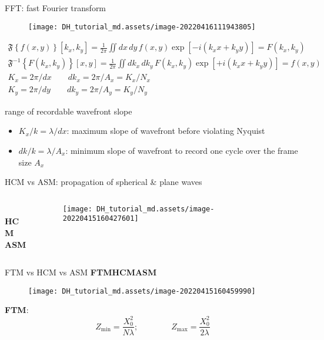 \documentclass[t, aspectratio=169]{beamer}
\begin{document}
\begin{frame}{FFT: fast Fourier transform}
	\begin{figure}
		\texttt{[image: DH\_tutorial\_md.assets/image-20220416111943805]}
	\end{figure}
	\begin{gather*}
\mathfrak F\left\{f(x,y)\right\}[k_x,k_y] = \frac{1}{2\pi}\iint dx\,dy\,f(x,y)\exp\left[-i(k_x x + k_yy)\right] = F(k_x,k_y) \\
\mathfrak F^{-1}\left\{F(k_x,k_y)\right\}[x,y] = \frac{1}{2\pi}\iint dk_x\,dk_y\,F(k_x,k_y)\exp\left[+i(k_x x + k_yy)\right] = f(x,y) \\
K_x = 2\pi/dx \qquad dk_x = 2\pi/A_x = K_x/N_x \\
K_y = 2\pi/dy \qquad dk_y = 2\pi/A_y = K_y/N_y
	\end{gather*}
\end{frame}


\begin{frame}{range of recordable wavefront slope}
	\begin{itemize}
		\item $K_x/k=\lambda/dx$: maximum slope of wavefront before violating Nyquist
		\item $dk/k = \lambda/A_x$: minimum slope of wavefront to record one cycle over the frame size $A_x$ 
	\end{itemize}
\end{frame}


\begin{frame}{HCM vs ASM: propagation of spherical \& plane waves}
	\begin{columns}
		\begin{column}{.1\textwidth}
\textbf{ }\\
\vspace{10 mm}
\textbf{HCM}\\
\vspace{20 mm}
\textbf{ASM}
		\end{column}
		\begin{column}{.9\textwidth}
			\begin{figure}
				\texttt{[image: DH\_tutorial\_md.assets/image-20220415160427601]}
			\end{figure}
		\end{column}
	\end{columns}
\end{frame}


\begin{frame}{FTM vs HCM vs ASM}
\hspace{30 mm}\textbf{FTM}\hspace{30 mm}\textbf{HCM}\hspace{30 mm}\textbf{ASM}
	\begin{figure}
		\texttt{[image: DH\_tutorial\_md.assets/image-20220415160459990]}
	\end{figure}
	\textbf{FTM}: 
	\[ Z_{\min} = \frac{X_0^2}{N\lambda}; \qquad\qquad Z_{\max} = \frac{X_0^2}{2\lambda} \]
\end{frame}
\end{document}
